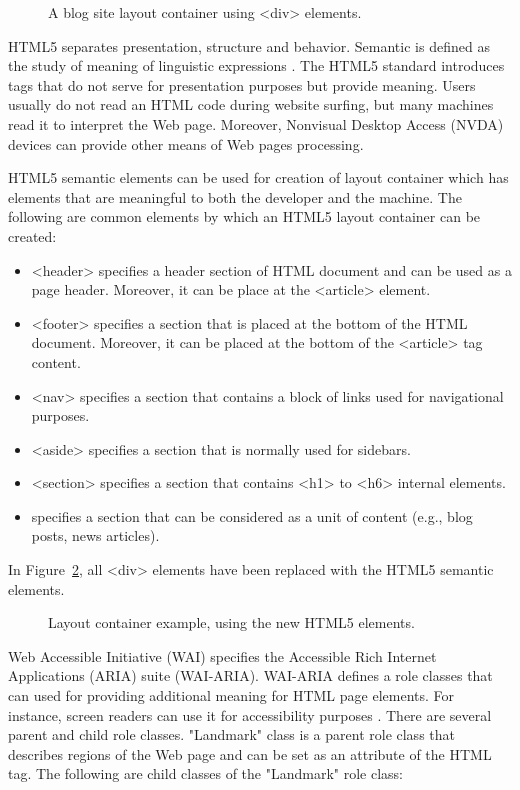 \begin{figure}[ht]
	\caption{A blog site layout container using <div> elements.}\label{fig:blogLayout}
\end{figure}

HTML5 separates presentation, structure and behavior. Semantic is defined as the study of meaning of linguistic expressions \cite{Johnson}. The HTML5 standard introduces tags that do not serve for presentation purposes but provide meaning. Users usually do not read an HTML code during website surfing, but many machines read it to interpret the Web page. Moreover, Nonvisual Desktop Access (NVDA) devices can provide other means of Web pages processing.

HTML5 semantic elements can be used for creation of layout container which has elements that are meaningful to both the developer and the machine. The following are common elements by which an HTML5 layout container can be created:

\begin{itemize}
	\item <header> specifies a header section of HTML document and can be used as a page header. Moreover, it can be place at the <article> element.
	\item <footer> specifies a section that is placed at the bottom of the HTML document. Moreover, it can be placed at the bottom of the <article> tag content.
	\item <nav> specifies a section that contains a block of links used for navigational purposes.
	\item <aside> specifies a section that is normally used for sidebars.
	\item <section> specifies a section that contains <h1> to <h6> internal elements.
	\item <article> specifies a section that can be considered as a unit of content (e.g., blog posts, news articles).
\end{itemize}

In Figure~\cref{fig:blogLayoutNew}, all <div> elements have been replaced with the HTML5 semantic elements.

\begin{figure}[ht]
	\caption{Layout container example, using the new HTML5 elements.}\label{fig:blogLayoutNew}
\end{figure}

Web Accessible Initiative (WAI) specifies the Accessible Rich Internet Applications (ARIA) suite (WAI-ARIA). WAI-ARIA defines a role classes that can used for providing additional meaning for HTML page elements. For instance, screen readers can use it for accessibility purposes \cite{Thiessen}. There are several parent and child role classes. "Landmark" class is a parent role class that describes regions of the Web page and can be set as an attribute of the HTML tag. The following are child classes of the "Landmark" role class:

